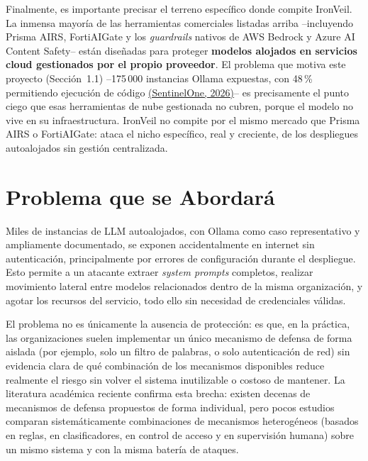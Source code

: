 \documentclass[11pt,letterpaper]{article}
\newcommand{\citeapa}[2]{\hyperlink{#1}{#2}}
\begin{document}
Finalmente, es importante precisar el terreno específico donde compite IronVeil. La inmensa mayoría de las herramientas comerciales listadas arriba --incluyendo Prisma AIRS, FortiAIGate y los \emph{guardrails} nativos de AWS Bedrock y Azure AI Content Safety-- están diseñadas para proteger \textbf{modelos alojados en servicios cloud gestionados por el propio proveedor}. El problema que motiva este proyecto (Sección~1.1) --175\,000 instancias Ollama expuestas, con 48\,\% permitiendo ejecución de código \citeapa{sentinelone2026}{(SentinelOne, 2026)}-- es precisamente el punto ciego que esas herramientas de nube gestionada no cubren, porque el modelo no vive en su infraestructura. IronVeil no compite por el mismo mercado que Prisma AIRS o FortiAIGate: ataca el nicho específico, real y creciente, de los despliegues autoalojados sin gestión centralizada.

\section{Problema que se Abordará}

Miles de instancias de LLM autoalojados, con Ollama como caso representativo y ampliamente documentado, se exponen accidentalmente en internet sin autenticación, principalmente por errores de configuración durante el despliegue. Esto permite a un atacante extraer \emph{system prompts} completos, realizar movimiento lateral entre modelos relacionados dentro de la misma organización, y agotar los recursos del servicio, todo ello sin necesidad de credenciales válidas.

El problema no es únicamente la ausencia de protección: es que, en la práctica, las organizaciones suelen implementar un único mecanismo de defensa de forma aislada (por ejemplo, solo un filtro de palabras, o solo autenticación de red) sin evidencia clara de qué combinación de los mecanismos disponibles reduce realmente el riesgo sin volver el sistema inutilizable o costoso de mantener. La literatura académica reciente confirma esta brecha: existen decenas de mecanismos de defensa propuestos de forma individual, pero pocos estudios comparan sistemáticamente combinaciones de mecanismos heterogéneos (basados en reglas, en clasificadores, en control de acceso y en supervisión humana) sobre un mismo sistema y con la misma batería de ataques.
\end{document}
